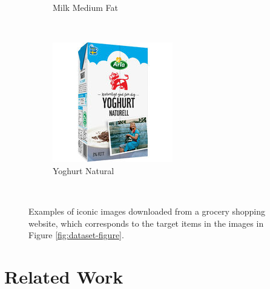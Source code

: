 \begin{figure}[t]
\begin{minipage}[b]{0.47\textwidth}
\begin{subfigure}[t]{0.32\textwidth}
			\caption{Milk Medium Fat}
			\label{subfig:clean-image-q}
		\end{subfigure}~
		\begin{subfigure}[t]{0.32\textwidth}
			\centering
			\includegraphics[width=\textwidth]{PaperA/clean-image-figure/Arla-Natural-Yoghurt_Clean.jpg}
			\caption{Yoghurt Natural}
			\label{subfig:clean-image-r}
		\end{subfigure}~ 
		\vspace{-1mm}
		\captionsetup{font=footnotesize}
		\caption{Examples of iconic images downloaded from a grocery shopping website, which corresponds to the target items in the images in Figure \ref{fig:dataset-figure}. \newline }
		\label{fig:clean-image-figure}
	\end{minipage} 
	\vspace{-3mm}
\end{figure}


\section{Related Work}\label{paperA:sec:related_work}

